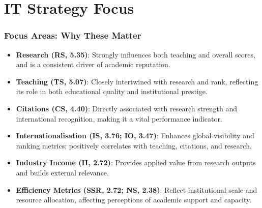 \documentclass[aspectratio=169, table]{beamer}
\begin{document}
\section{IT Strategy Focus}
\begin{frame}
	\vspace{20pt}
	\frametitle{Focus Areas: Why These Matter}
	\begin{itemize}
		\item \textbf{Research (RS, 5.35)}: Strongly influences both teaching and overall scores, and is a consistent driver of academic reputation.
		
		\item \textbf{Teaching (TS, 5.07)}: Closely intertwined with research and rank, reflecting its role in both educational quality and institutional prestige.
		
		\item \textbf{Citations (CS, 4.40)}: Directly associated with research strength and international recognition, making it a vital performance indicator.
		
		\item \textbf{Internationalisation (IS, 3.76; IO, 3.47)}: Enhances global visibility and ranking metrics; positively correlates with teaching, citations, and research.
		
		\item \textbf{Industry Income (II, 2.72)}: Provides applied value from research outputs and builds external relevance.
		
		\item \textbf{Efficiency Metrics (SSR, 2.72; NS, 2.38)}: Reflect institutional scale and resource allocation, affecting perceptions of academic support and capacity.
	\end{itemize}
\end{frame}
\end{document}
